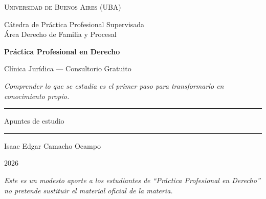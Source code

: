 \documentclass[12pt,oneside]{book}
\newcommand{\universidad}{Universidad de Buenos Aires (UBA)}
\newcommand{\departamento}{C\'atedra de Pr\'actica Profesional Supervisada\\[0.15cm] \'Area Derecho de Familia y Procesal}
\newcommand{\materia}{Pr\'actica Profesional en Derecho}
\newcommand{\titulo}{Cl\'inica Jur\'idica --- Consultorio Gratuito}
\newcommand{\autor}{Isaac Edgar Camacho Ocampo}
\newcommand{\anio}{2026}
\begin{document}
\begin{titlepage}

\thispagestyle{empty}

\begin{center}

\vspace*{1cm}

{\large \textsc{\universidad}}

\vspace{0.4cm}

{\large \departamento}

\vspace{3cm}

{\Huge \textbf{\materia}}

\vspace{1cm}

{\LARGE \titulo}

\vspace{0.8cm}

\textit{Comprender lo que se estudia es el primer paso para transformarlo en conocimiento propio.}

\vspace{1.2cm}

\rule{0.70\textwidth}{0.5pt}

\vspace{0.5cm}

{\large Apuntes de estudio}

\vspace{0.5cm}

\rule{0.70\textwidth}{0.5pt}

\vfill

{\large \autor}

\vspace{0.3cm}

{\large \anio}

\end{center}

\vfill

\begin{flushleft}
\textit{Este es un modesto aporte a los estudiantes de ``Pr\'actica Profesional en Derecho'' no pretende sustituir el material oficial de la materia.}
\end{flushleft}

\end{titlepage}

\tableofcontents
\end{document}
